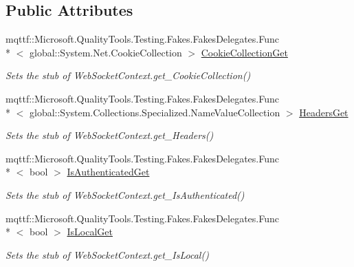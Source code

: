 \subsection*{Public Attributes}
\begin{DoxyCompactItemize}
\item 
mqttf\-::\-Microsoft.\-Quality\-Tools.\-Testing.\-Fakes.\-Fakes\-Delegates.\-Func\\*
$<$ global\-::\-System.\-Net.\-Cookie\-Collection $>$ \hyperlink{class_system_1_1_net_1_1_web_sockets_1_1_fakes_1_1_stub_web_socket_context_ac8330a0a2c4435a592c2a986679094b6}{Cookie\-Collection\-Get}
\begin{DoxyCompactList}\small\item\em Sets the stub of Web\-Socket\-Context.\-get\-\_\-\-Cookie\-Collection()\end{DoxyCompactList}\item 
mqttf\-::\-Microsoft.\-Quality\-Tools.\-Testing.\-Fakes.\-Fakes\-Delegates.\-Func\\*
$<$ global\-::\-System.\-Collections.\-Specialized.\-Name\-Value\-Collection $>$ \hyperlink{class_system_1_1_net_1_1_web_sockets_1_1_fakes_1_1_stub_web_socket_context_aab7e582b3bf78057af177717bab5beca}{Headers\-Get}
\begin{DoxyCompactList}\small\item\em Sets the stub of Web\-Socket\-Context.\-get\-\_\-\-Headers()\end{DoxyCompactList}\item 
mqttf\-::\-Microsoft.\-Quality\-Tools.\-Testing.\-Fakes.\-Fakes\-Delegates.\-Func\\*
$<$ bool $>$ \hyperlink{class_system_1_1_net_1_1_web_sockets_1_1_fakes_1_1_stub_web_socket_context_afdacfc8ed130be5c35ac9db751c8d39b}{Is\-Authenticated\-Get}
\begin{DoxyCompactList}\small\item\em Sets the stub of Web\-Socket\-Context.\-get\-\_\-\-Is\-Authenticated()\end{DoxyCompactList}\item 
mqttf\-::\-Microsoft.\-Quality\-Tools.\-Testing.\-Fakes.\-Fakes\-Delegates.\-Func\\*
$<$ bool $>$ \hyperlink{class_system_1_1_net_1_1_web_sockets_1_1_fakes_1_1_stub_web_socket_context_a8612de2bb542a7dcbaa25177a27d3f85}{Is\-Local\-Get}
\begin{DoxyCompactList}\small\item\em Sets the stub of Web\-Socket\-Context.\-get\-\_\-\-Is\-Local()\end{DoxyCompactList}\item 

\end{DoxyCompactItemize}
